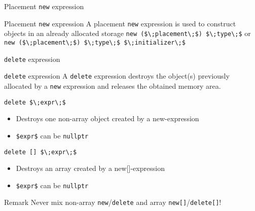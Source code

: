 \begin{frame}{Placement \texttt{new} expression}{}
  \begin{block}{Placement \texttt{new} expression}
    A placement \lstinline!new! expression is used to construct objects in an already allocated storage
    {
      \hfill\lstinline[mathescape]!new ($\;placement\;$) $\;type\;$! or \lstinline[mathescape]!new ($\;placement\;$) $\;type\;$ $\;initializer\;$!\hfill
    }
  \end{block}

  \begin{example}
  \end{example}
\end{frame}

\begin{frame}{\texttt{delete} expression}{}
  \begin{block}{\texttt{delete} expression}
    A \lstinline!delete! expression destroys the object(s) previously allocated by a \lstinline!new! expression and releases the obtained memory area.

    {
      \hfill\lstinline[mathescape]!delete $\;expr\;$!\hfill
    }
    \begin{itemize}
    \item
      Destroys one non-array object created by a new-expression
    \item
      \lstinline[mathescape]!$expr$! can be \lstinline!nullptr!
    \end{itemize}
    {
      \hfill\lstinline[mathescape]!delete [] $\;expr\;$!\hfill
    }
    \begin{itemize}
    \item
      Destroys an array created by a new[]-expression
    \item
      \lstinline[mathescape]!$expr$! can be \lstinline!nullptr!
    \end{itemize}
  \end{block}

  \begin{block}{Remark}
    Never mix non-array \lstinline!new!/\lstinline!delete! and array \lstinline!new[]!/\lstinline!delete[]!!
  \end{block}
\end{frame}

